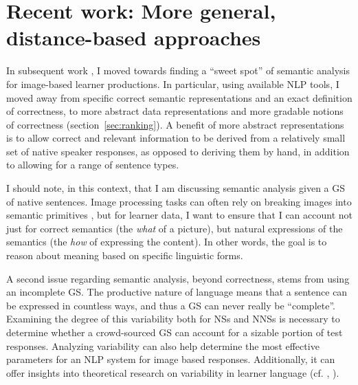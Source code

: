 

\section{Recent work: More general, distance-based approaches}


In subsequent work \citep{king:dickinson:16}, I moved towards finding a ``sweet spot'' of
semantic analysis \citep[cf.][]{bailey:meurers:08} for
image-based learner productions.
In particular, using available NLP tools,
I moved away from specific correct semantic representations and an
exact definition of correctness, to more abstract data representations
and more gradable notions of correctness (section~\ref{sec:ranking}).
A benefit of more abstract representations is to allow correct
and relevant information to be derived from a relatively small set of
native speaker responses, as opposed to deriving them by hand, in
addition to allowing for a range of sentence types.

I should note, in this context, that I am discussing semantic
analysis given a GS of native sentences.  Image processing
tasks can often rely on breaking images into semantic primitives
\citep[see, e.g.,][and references therein]{ortiz:wolff:lapata:15}, but
for learner data, I want to ensure that I can account not just for
correct semantics (the \emph{what} of a picture), but natural
expressions of the semantics (the \emph{how} of expressing the
content).  In other words, the goal is  to reason about meaning based on
specific linguistic forms.

A second issue regarding semantic analysis, beyond correctness, stems
from using an incomplete GS. The productive nature of language means that a sentence can be expressed in countless ways, and thus a GS can never really be ``complete''. Examining the degree
of this variability both for NSs and NNSs is necessary to determine whether a crowd-sourced GS can account for a sizable portion of test responses. Analyzing variability can also help determine the most effective parameters for an NLP system for image based responses. Additionally, it can offer insights into theoretical research on variability 
in learner language (cf. \citet{ellis1987variability}, \citet{kanno1998consistency}).

